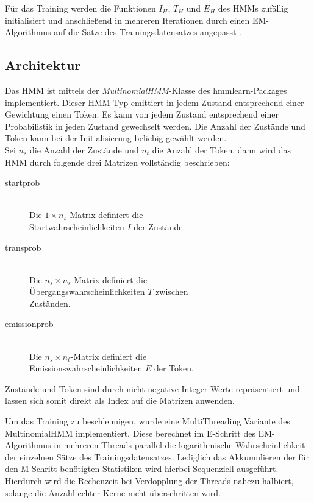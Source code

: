 \documentclass[conference]{IEEEtran}
\begin{document}
Für das Training werden die Funktionen $I_H$, $T_H$ und $E_H$ des HMMs zufällig initialisiert und anschließend in mehreren Iterationen durch einen EM-Algorithmus auf die Sätze des Trainingsdatensatzes angepasst \cite{hmmTraining}.

\subsection{Architektur}
Das HMM ist mittels der \textit{MultinomialHMM}-Klasse des hmmlearn-Packages \cite{hmmlearn} implementiert. 
Dieser HMM-Typ emittiert in jedem Zustand entsprechend einer Gewichtung einen Token.
Es kann von jedem Zustand entsprechend einer Probabilistik in jeden Zustand gewechselt werden.
Die Anzahl der Zustände und Token kann bei der Initialisierung beliebig gewählt werden.\\
Sei $n_s$ die Anzahl der Zustände und $n_t$ die Anzahl der Token, dann wird das HMM durch folgende drei Matrizen vollständig beschrieben:
\begin{description}
\item[startprob]\hfill \\
Die $1\times n_s$-Matrix definiert die \\Startwahrscheinlichkeiten $I$ der Zustände.\\
\item[transprob]\hfill \\
Die $n_s\times n_s$-Matrix definiert die \\Übergangswahrscheinlichkeiten $T$ zwischen \\Zuständen.\\
\item[emissionprob]\hfill \\
Die $n_s\times n_t$-Matrix definiert die \\Emissionswahrscheinlichkeiten $E$ der Token.
\end{description}
Zustände und Token sind durch nicht-negative Integer-Werte repräsentiert und lassen sich somit direkt als Index auf die Matrizen anwenden.

Um das Training zu beschleunigen, wurde eine MultiThreading Variante des MultinomialHMM implementiert.
Diese berechnet im E-Schritt des EM-Algorithmus in mehreren Threads parallel die logarithmische Wahrscheinlichkeit der einzelnen Sätze des Trainingsdatensatzes.
Lediglich das Akkumulieren der für den M-Schritt benötigten Statistiken wird hierbei Sequenziell ausgeführt.
Hierdurch wird die Rechenzeit bei Verdopplung der Threads nahezu halbiert, solange die Anzahl echter Kerne nicht überschritten wird.
\end{document}
